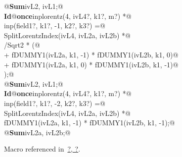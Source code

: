 \documentclass[a4paper,12pt]{amsart}
\renewcommand{\NWlink}[2]{\hyperlink{#1}{#2}}
\renewcommand{\NWtxtMacroRefIn}{Macro referenced in}
\renewcommand{\NWsep}{${\diamond}$}
\begin{document}
\begin{flushleft}
\begin{list}{}{}
\mbox{}\verb@   @\hbox{\sffamily\bfseries Sum}\verb@ ivL2, ivL1;@\\
\mbox{}\verb@@\hbox{\sffamily\bfseries Id}\verb@ @\hbox{\sffamily\bfseries once}\verb@ inplorentz(4, ivL4?, k1?, m?) *@\\
\mbox{}\verb@      inp(field1?, k1?, -1, k2?, k3?) =@\\
\mbox{}\verb@   SplitLorentzIndex(ivL4, ivL2a, ivL2b) *@\\
\mbox{}/Sqrt2 * (@\\
\mbox{}\verb@      + fDUMMY1(ivL2a, k1, -1) * fDUMMY1(ivL2b, k1,  0)@\\
\mbox{}\verb@      + fDUMMY1(ivL2a, k1,  0) * fDUMMY1(ivL2b, k1, -1)@\\
\mbox{}\verb@   );@\\
\mbox{}\verb@   @\hbox{\sffamily\bfseries Sum}\verb@ ivL2, ivL1;@\\
\mbox{}\verb@@\hbox{\sffamily\bfseries Id}\verb@ @\hbox{\sffamily\bfseries once}\verb@ inplorentz(4, ivL4?, k1?, m?) *@\\
\mbox{}\verb@      inp(field1?, k1?, -2, k2?, k3?) =@\\
\mbox{}\verb@   SplitLorentzIndex(ivL4, ivL2a, ivL2b) *@\\
\mbox{}\verb@   fDUMMY1(ivL2a, k1, -1) * fDUMMY1(ivL2b, k1, -1);@\\
\mbox{}\verb@   @\hbox{\sffamily\bfseries Sum}\verb@ ivL2a, ivL2b;@\\
\mbox{}\verb@@{\NWsep}
\end{list}
\vspace{-1.5ex}
\footnotesize
\begin{list}{}{\setlength{\itemsep}{-\parsep}\setlength{\itemindent}{-\leftmargin}}
\item \NWtxtMacroRefIn\ \NWlink{nuweb?}{?}\NWlink{nuweb?}{, ?}.

\item{}
\end{list}
\vspace{4ex}
\end{flushleft}
\end{document}
